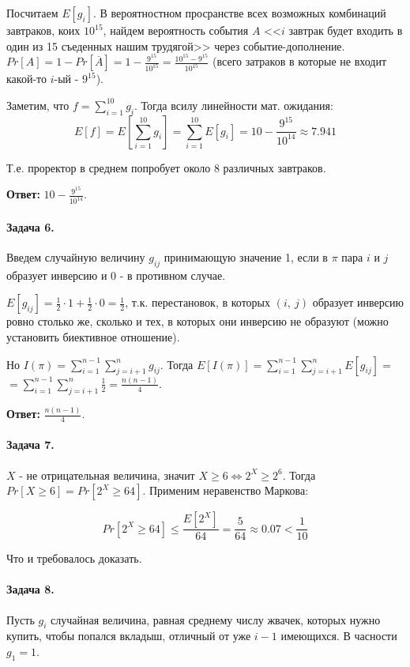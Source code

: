 \documentclass{article}
\newcommand{\pair}[2]{(#1,\ #2)}
\newcommand{\half}[1]{\frac{#1}{2}}
\begin{document}
    Посчитаем $E[g_i]$. В вероятностном просранстве всех возможных комбинаций завтраков, коих $10^{15}$, найдем вероятность события $A$ <<$i$ завтрак будет входить в один из 15 съеденных нашим трудягой>> через событие-дополнение. $Pr[A] = 1 - Pr[\overline{A}] = 1 - \frac{9^{15}}{10^{15}} = \frac{10^{15} - 9^{15}}{10^{15}}$ (всего затраков в которые не входит какой-то $i$-ый - $9^{15}$).

    Заметим, что $f = \sum_{i=1}^{10}g_i$. Тогда всилу линейности мат. ожидания:
    $$ E[f] = 
    E[\sum_{i=1}^{10} g_i] = \sum_{i=1}^{10} E[g_i] = 10 - \frac{9^{15}}{10^{14}} \approx 7.941 $$

    Т.е. проректор в среднем попробует около 8 различных завтраков.

    \textbf{Ответ:} $10 - \frac{9^{15}}{10^{14}}$.


    \paragraph{Задача 6.}
    Введем случайную величину $g_{ij}$ принимающую значение 1, если в $\pi$
    пара $i$ и $j$ образует инверсию и 0 - в противном случае.

    $E[g_{ij}] = \frac{1}{2} \cdot 1 + \frac{1}{2} \cdot 0 = \half{1}$, т.к. перестановок, в которых $\pair{i}{j}$ образует инверсию ровно столько же, сколько и тех, в которых они инверсию не образуют (можно установить биективное отношение).

    Но $I({\pi}) = \sum_{i=1}^{n - 1}\sum_{j=i + 1}^{n}g_{ij}$. Тогда 
    $E[I(\pi)] = \sum_{i=1}^{n - 1}\sum_{j=i + 1}^{n}E[g_{ij}] = $ \linebreak $
    = \sum_{i=1}^{n - 1}\sum_{j=i + 1}^{n} \half{1} = \frac{n(n-1)}{4}$.

    \textbf{Ответ:} $\frac{n(n-1)}{4}$.

    \paragraph{Задача 7.}
    $X$ - не отрицательная величина, значит $X \ge 6 \Leftrightarrow 2^X \ge 2^6.$ Тогда $Pr[X \ge 6] = Pr[2^X \ge 64]$. Применим неравенство Маркова:

    $$ Pr[2^X \ge 64] \le \frac{E[2^X]}{64} = \frac{5}{64} \approx 0.07 < \frac{1}{10}$$

    Что и требовалось доказать.

    \paragraph{Задача 8.}
    Пусть $g_i$ случайная величина, равная среднему числу жвачек, которых нужно купить, чтобы попался вкладыш, отличный от уже $i - 1$ имеющихся. В часности $g_1 = 1$.
\end{document}
